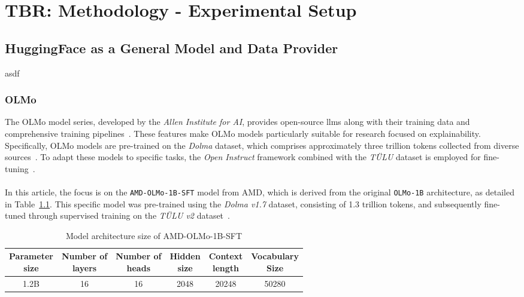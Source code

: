 \chapter{TBR: Methodology - Experimental Setup}

\section{HuggingFace as a General Model and Data Provider}
asdf

\subsection{OLMo}
The OLMo model series, developed by the \emph{Allen Institute for AI}, provides open-source \acrshort{llm}s along with their training data and comprehensive training pipelines~\cite{Groeneveld2023OLMo}. These features make OLMo models particularly suitable for research focused on explainability. Specifically, OLMo models are pre-trained on the \emph{Dolma} dataset, which comprises approximately three trillion tokens collected from diverse sources~\cite{dolma}. To adapt these models to specific tasks, the \emph{Open Instruct} framework combined with the \emph{TÜLU} dataset is employed for fine-tuning~\cite{ivison2023camels}.
\\\\
In this article, the focus is on the \texttt{AMD-OLMo-1B-SFT} model from AMD, which is derived from the original \texttt{OLMo-1B} architecture, as detailed in Table~\ref{tab:model_architecture_olmo_1b_amd}. This specific model was pre-trained using the \emph{Dolma v1.7} dataset, consisting of 1.3 trillion tokens, and subsequently fine-tuned through supervised training on the \emph{TÜLU v2} dataset~\cite{AMD-OLMo}.
\begin{table}[htb]
    \centering
    \begin{tabular}{|c|c|c|c|c|c|}
        \hline  
        \BreakHeader{Parameter \\ size} & \BreakHeader{Number of \\ layers} & \BreakHeader{Number of \\ heads} & \BreakHeader{Hidden \\ size} & \BreakHeader{Context \\ length} & \BreakHeader{Vocabulary \\ Size} \\ 
        \hline  
        1.2B & 16 & 16 & 2048 & 20248 & 50280 \\
        \hline
    \end{tabular}
    \caption{Model architecture size of AMD-OLMo-1B-SFT}
    \label{tab:model_architecture_olmo_1b_amd}
\end{table} 
